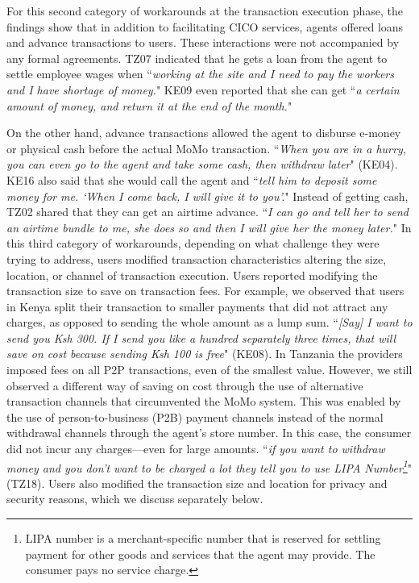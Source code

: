 For this second category of workarounds at the transaction execution phase, the findings show that in addition to facilitating CICO services, agents offered loans and advance transactions to users. These interactions were not accompanied by any formal agreements. TZ07 indicated that he gets a loan from the agent to settle employee wages when ``\textit{working at the site and I need to pay the workers and I have shortage of money.}" KE09 even reported that she can get ``\textit{a certain amount of money, and return it at the end of the month.}"

On the other hand, advance transactions allowed the agent to disburse e-money or physical cash before the actual MoMo transaction. ``\textit{When you are in a hurry, you can even go to the agent and take some cash, then withdraw later}" (KE04). KE16 also said that she would call the agent and ``\textit{tell him to deposit some money for me. `When I come back, I will give it to you'.}"  Instead of getting cash, TZ02 shared that they can get an airtime advance.  ``\textit{I can go and tell her to send an airtime bundle to me, she does so and then I will give her the money later.}"
\label{sec:TxModification}
In this third category of workarounds, depending on what challenge they were trying to address, users modified transaction characteristics altering the size, location, or channel of transaction execution. Users reported modifying the transaction size to save on transaction fees. For example, we observed that users in Kenya split their transaction to smaller payments that did not attract any charges, as opposed to sending the whole amount as a lump sum. ``\textit{[Say] I want to send you Ksh 300. If I send you like a hundred separately three times, that will save on cost because sending Ksh 100 is free}" (KE08). In Tanzania the providers imposed fees on all P2P transactions, even of the smallest value. However, we still observed a different way of saving on cost through the use of alternative transaction channels that circumvented the MoMo system. This was enabled by the use of person-to-business (P2B) payment channels instead of the normal withdrawal channels through the agent's store number. In this case, the consumer did not incur any charges---even for large amounts. ``\textit{if you want to withdraw money and you don’t want to be charged a lot they tell you to use \textit{LIPA Number}\footnote{LIPA number is a merchant-specific number that is reserved for settling payment for other goods and services that the agent may provide. The consumer pays no service charge.}}" (TZ18). Users also modified the transaction size and location for privacy and security reasons, which we discuss separately below. 
